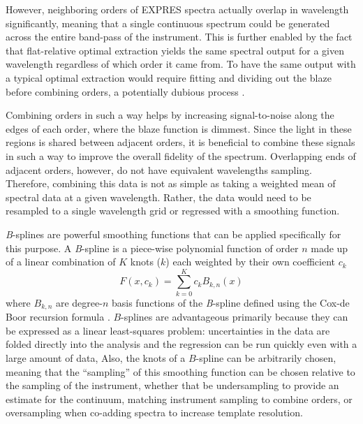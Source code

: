 However, neighboring orders of EXPRES spectra actually overlap in wavelength significantly, meaning that a single continuous spectrum could be generated across the entire band-pass of the instrument. This is further enabled by the fact that flat-relative optimal extraction yields the same spectral output for a given wavelength regardless of which order it came from. To have the same output with a typical optimal extraction would require fitting and dividing out the blaze before combining orders, a potentially dubious process \citep{xu_modeling_2019}.

Combining orders in such a way helps by increasing signal-to-noise along the edges of each order, where the blaze function is dimmest. Since the light in these regions is shared between adjacent orders, it is beneficial to combine these signals in such a way to improve the overall fidelity of the spectrum. Overlapping ends of adjacent orders, however, do not have equivalent wavelengths sampling. Therefore, combining this data is not as simple as taking a weighted mean of spectral data at a given wavelength. Rather, the data would need to be resampled to a single wavelength grid \citep{anglada-escude_harps-terra_2012} or regressed with a smoothing function.

\textit{B}-splines \citep{de_boor_practical_1978, dierckx_curve_1995, eilers_flexible_1996} are powerful smoothing functions that can be applied specifically for this purpose. A \textit{B}-spline is a piece-wise polynomial function of order $n$ made up of a linear combination of $K$ knots ($k$) each weighted by their own coefficient $c_k$
\begin{equation}
    F(x,{c_k}) = \sum_{k=0}^{K} {c_k B_{k,n}(x)}
\end{equation}
where $B_{k,n}$ are degree-$n$ basis functions of the \textit{B}-spline defined using the Cox-de Boor recursion formula \citep{de_boor_practical_1978}. $B$-splines are advantageous primarily because they can be expressed as a linear least-squares problem: uncertainties in the data are folded directly into the analysis and the regression can be run quickly even with a large amount of data, Also, the knots of a $B$-spline can be arbitrarily chosen, meaning that the ``sampling'' of this smoothing function can be chosen relative to the sampling of the instrument, whether that be undersampling to provide an estimate for the continuum, matching instrument sampling to combine orders, or oversampling when co-adding spectra to increase template resolution.

